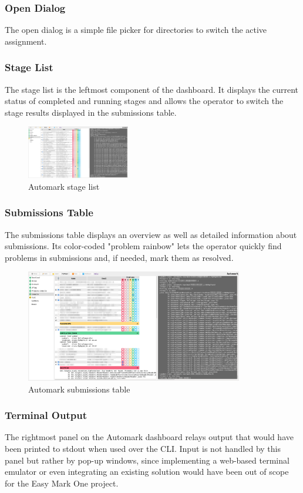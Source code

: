 \documentclass[12pt,a4paper,oneside]{report}
\begin{document}
	\subsubsection{Open Dialog}
	The open dialog is a simple file picker for directories to switch the active assignment.

	\subsubsection{Stage List}
	The stage list is the leftmost component of the dashboard. It displays the current status of completed and running stages and allows the operator to switch the stage results displayed in the submissions table.

	\begin{figure}[H]
		\centering
		\includegraphics[width=4.5cm,trim=0 30cm 78.9cm 1.5cm,clip]{automark_dashboard.png}
		\caption{Automark stage list}
	\end{figure}

	\subsubsection{Submissions Table}
	The submissions table displays an overview as well as detailed information about submissions. Its color-coded "problem rainbow" lets the operator quickly find problems in submissions and, if needed, mark them as resolved.

	\begin{figure}[H]
		\centering
		\includegraphics[width=9.5cm,trim=11.5cm 10cm 40cm 2cm,clip]{automark_dashboard_w_details_expanded.png}
		\caption{Automark submissions table}
	\end{figure}

	\subsubsection{Terminal Output}
	The rightmost panel on the Automark dashboard relays output that would have been printed to stdout when used over the CLI. Input is not handled by this panel but rather by pop-up windows, since implementing a web-based terminal emulator or even integrating an existing solution would have been out of scope for the Easy Mark One project.
\end{document}
